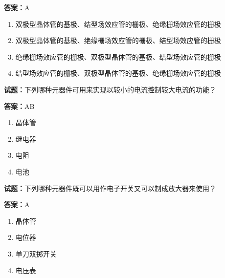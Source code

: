 \documentclass{ctexbook}
\begin{document}
\textbf{答案：}A 

\begin{enumerate}[leftmargin=3em]
  \item 双极型晶体管的基极、结型场效应管的栅极、绝缘栅场效应管的栅极 

  \item 双极型晶体管的基极、绝缘栅场效应管的栅极、结型场效应管的栅极 

  \item 绝缘栅场效应管的栅极、双极型晶体管的基极、结型场效应管的栅极 

  \item 结型场效应管的栅极、双极型晶体管的基极、绝缘栅场效应管的栅极 

\end{enumerate}





\vspace{1em}

\textbf{试题：}下列哪种元器件可用来实现以较小的电流控制较大电流的功能？ 

\textbf{答案：}AB 

\begin{enumerate}[leftmargin=3em]
  \item 晶体管 

  \item 继电器 

  \item 电阻 

  \item 电池 

\end{enumerate}





\vspace{1em}

\textbf{试题：}下列哪种元器件既可以用作电子开关又可以制成放大器来使用？ 

\textbf{答案：}A 

\begin{enumerate}[leftmargin=3em]
  \item 晶体管 

  \item 电位器 

  \item 单刀双掷开关 

  \item 电压表 

\end{enumerate}
\end{document}
